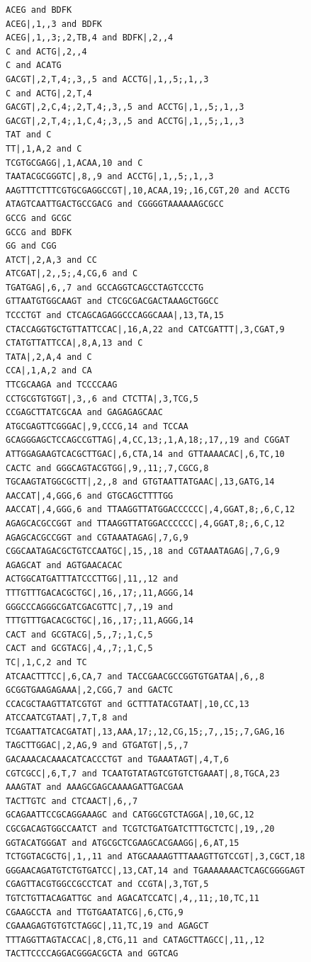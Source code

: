 \documentclass[a4paper,12pt,twoside,BCOR=10mm]{scrbook}
\begin{document}
\begin{lstlisting}
ACEG and BDFK
ACEG|,1,,3 and BDFK
ACEG|,1,,3;,2,TB,4 and BDFK|,2,,4
C and ACTG|,2,,4
C and ACATG
GACGT|,2,T,4;,3,,5 and ACCTG|,1,,5;,1,,3
C and ACTG|,2,T,4
GACGT|,2,C,4;,2,T,4;,3,,5 and ACCTG|,1,,5;,1,,3
GACGT|,2,T,4;,1,C,4;,3,,5 and ACCTG|,1,,5;,1,,3
TAT and C
TT|,1,A,2 and C
TCGTGCGAGG|,1,ACAA,10 and C
TAATACGCGGGTC|,8,,9 and ACCTG|,1,,5;,1,,3
AAGTTTCTTTCGTGCGAGGCCGT|,10,ACAA,19;,16,CGT,20 and ACCTG
ATAGTCAATTGACTGCCGACG and CGGGGTAAAAAAGCGCC
GCCG and GCGC
GCCG and BDFK
GG and CGG
ATCT|,2,A,3 and CC
ATCGAT|,2,,5;,4,CG,6 and C
TGATGAG|,6,,7 and GCCAGGTCAGCCTAGTCCCTG
GTTAATGTGGCAAGT and CTCGCGACGACTAAAGCTGGCC
TCCCTGT and CTCAGCAGAGGCCCAGGCAAA|,13,TA,15
CTACCAGGTGCTGTTATTCCAC|,16,A,22 and CATCGATTT|,3,CGAT,9
CTATGTTATTCCA|,8,A,13 and C
TATA|,2,A,4 and C
CCA|,1,A,2 and CA
TTCGCAAGA and TCCCCAAG
CCTGCGTGTGGT|,3,,6 and CTCTTA|,3,TCG,5
CCGAGCTTATCGCAA and GAGAGAGCAAC
ATGCGAGTTCGGGAC|,9,CCCG,14 and TCCAA
GCAGGGAGCTCCAGCCGTTAG|,4,CC,13;,1,A,18;,17,,19 and CGGAT
ATTGGAGAAGTCACGCTTGAC|,6,CTA,14 and GTTAAAACAC|,6,TC,10
CACTC and GGGCAGTACGTGG|,9,,11;,7,CGCG,8
TGCAAGTATGGCGCTT|,2,,8 and GTGTAATTATGAAC|,13,GATG,14
AACCAT|,4,GGG,6 and GTGCAGCTTTTGG
AACCAT|,4,GGG,6 and TTAAGGTTATGGACCCCCC|,4,GGAT,8;,6,C,12
AGAGCACGCCGGT and TTAAGGTTATGGACCCCCC|,4,GGAT,8;,6,C,12
AGAGCACGCCGGT and CGTAAATAGAG|,7,G,9
CGGCAATAGACGCTGTCCAATGC|,15,,18 and CGTAAATAGAG|,7,G,9
AGAGCAT and AGTGAACACAC
ACTGGCATGATTTATCCCTTGG|,11,,12 and TTTGTTTGACACGCTGC|,16,,17;,11,AGGG,14
GGGCCCAGGGCGATCGACGTTC|,7,,19 and TTTGTTTGACACGCTGC|,16,,17;,11,AGGG,14
CACT and GCGTACG|,5,,7;,1,C,5
CACT and GCGTACG|,4,,7;,1,C,5
TC|,1,C,2 and TC
ATCAACTTTCC|,6,CA,7 and TACCGAACGCCGGTGTGATAA|,6,,8
GCGGTGAAGAGAAA|,2,CGG,7 and GACTC
CCACGCTAAGTTATCGTGT and GCTTTATACGTAAT|,10,CC,13
ATCCAATCGTAAT|,7,T,8 and TCGAATTATCACGATAT|,13,AAA,17;,12,CG,15;,7,,15;,7,GAG,16
TAGCTTGGAC|,2,AG,9 and GTGATGT|,5,,7
GACAAACACAAACATCACCCTGT and TGAAATAGT|,4,T,6
CGTCGCC|,6,T,7 and TCAATGTATAGTCGTGTCTGAAAT|,8,TGCA,23
AAAGTAT and AAAGCGAGCAAAAGATTGACGAA
TACTTGTC and CTCAACT|,6,,7
GCAGAATTCCGCAGGAAAGC and CATGGCGTCTAGGA|,10,GC,12
CGCGACAGTGGCCAATCT and TCGTCTGATGATCTTTGCTCTC|,19,,20
GGTACATGGGAT and ATGCGCTCGAAGCACGAAGG|,6,AT,15
TCTGGTACGCTG|,1,,11 and ATGCAAAAGTTTAAAGTTGTCCGT|,3,CGCT,18
GGGAACAGATGTCTGTGATCC|,13,CAT,14 and TGAAAAAAACTCAGCGGGGAGT
CGAGTTACGTGGCCGCCTCAT and CCGTA|,3,TGT,5
TGTCTGTTACAGATTGC and AGACATCCATC|,4,,11;,10,TC,11
CGAAGCCTA and TTGTGAATATCG|,6,CTG,9
CGAAAGAGTGTGTCTAGGC|,11,TC,19 and AGAGCT
TTTAGGTTAGTACCAC|,8,CTG,11 and CATAGCTTAGCC|,11,,12
TACTTCCCCAGGACGGGACGCTA and GGTCAG

\end{lstlisting}
\end{document}
